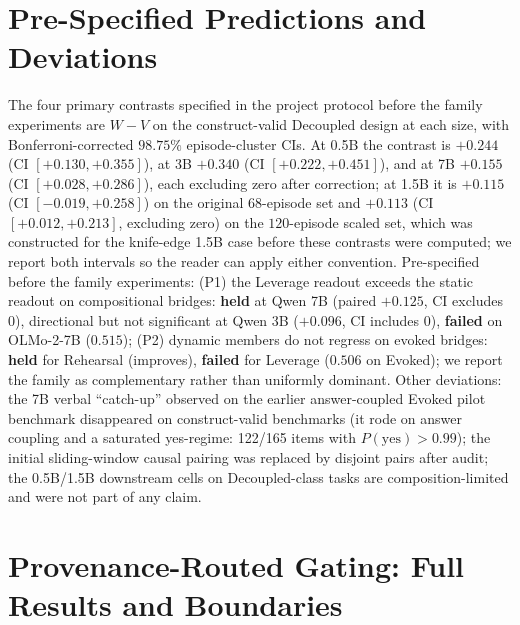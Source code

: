 \section{Pre-Specified Predictions and Deviations}
\label{app:prereg}
The four primary contrasts specified in the project protocol before the
family experiments are $W{-}V$ on the construct-valid Decoupled design at
each size, with Bonferroni-corrected $98.75\%$ episode-cluster CIs. At 0.5B
the contrast is $+0.244$ (CI $[+0.130, +0.355]$), at 3B $+0.340$
(CI $[+0.222, +0.451]$), and at 7B $+0.155$ (CI $[+0.028, +0.286]$), each
excluding zero after correction; at 1.5B it is $+0.115$
(CI $[-0.019, +0.258]$) on the original $68$-episode set and $+0.113$
(CI $[+0.012, +0.213]$, excluding zero) on the $120$-episode scaled set,
which was constructed for the knife-edge 1.5B case before these contrasts
were computed; we report both intervals so the reader can apply either
convention. Pre-specified before the family experiments: (P1) the Leverage readout exceeds
the static readout on compositional bridges: \textbf{held} at Qwen 7B (paired
$+0.125$, CI excludes 0), directional but not significant at Qwen 3B ($+0.096$,
CI includes 0), \textbf{failed} on OLMo-2-7B ($0.515$); (P2)
dynamic members do not regress on evoked bridges: \textbf{held} for Rehearsal
(improves), \textbf{failed} for Leverage ($0.506$ on Evoked); we report the family
as complementary rather than uniformly dominant. Other deviations: the 7B
verbal ``catch-up'' observed on the earlier answer-coupled Evoked pilot benchmark
disappeared on construct-valid benchmarks (it rode on answer coupling and a
saturated yes-regime: 122/165 items with $P(\text{yes}){>}0.99$); the initial
sliding-window causal pairing was replaced by disjoint pairs after audit; the
0.5B/1.5B downstream cells on Decoupled-class tasks are composition-limited and were
not part of any claim.

\section{Provenance-Routed Gating: Full Results and Boundaries}
\label{app:prg}

